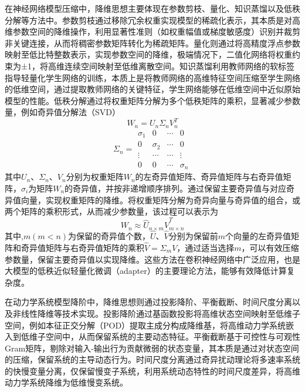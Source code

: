 在神经网络模型压缩中，降维思想主要体现在参数剪枝\cite{liu2023filter}、量化\cite{jacob2018quantization}、知识蒸馏\cite{hinton2015distilling}以及低秩分解\cite{han2015deep}等方法中。参数剪枝通过移除冗余权重实现模型的稀疏化表示，其本质是对高维参数空间的降维操作，利用显著性准则（如权重幅值或梯度敏感度）识别并裁剪非关键连接，从而将稠密参数矩阵转化为稀疏矩阵。量化则通过将高精度浮点参数映射至低比特整数表示，实现参数空间的降维，极端情况下，二值化网络将权重约束为±1，将高维连续空间映射至低维离散空间。知识蒸馏利用教师网络的软标签指导轻量化学生网络的训练，本质上是将教师网络的高维特征空间压缩至学生网络的低维空间，通过提取教师网络的关键特征，学生网络能够在低维空间中近似原始模型的性能。低秩分解通过将权重矩阵分解为多个低秩矩阵的乘积，显著减少参数量，例如奇异值分解法（SVD）
\begin{equation}
  \label{eq:svd}
  W_n = U_n\Sigma_n {V_n^T}
\end{equation}
\begin{equation}
  \label{eq:Sigma}
{\Sigma_n} = \begin{array}{*{20}{c}}
  {{\sigma _1}}&0& \cdots &0\\
  0&{{\sigma _2}}& \cdots &0\\
   \vdots & \cdots & \cdots & \vdots \\
  0&0& \cdots &{{\sigma _n}}
  \end{array}
\end{equation}
其中$U_n$、$\Sigma_n$、$V_n$分别为权重矩阵$W_n$的左奇异值矩阵、奇异值矩阵与右奇异值矩阵，$\sigma_i$为矩阵$W_n$的奇异值，并按非递增顺序排列。通过保留主要奇异值与对应奇异值向量，实现权重矩阵的降维。将权重矩阵分解为奇异向量与奇异值的组合，或两个矩阵的乘积形式，从而减少参数量，该过程可以表示为
\begin{equation}
  \label{eq:lowrank}
  W_n \approx {\hat{U}_{n\times m}}{\hat{V}_{m\times n}^T}
\end{equation}
其中,$m(m<n)$为保留的奇异值个数，$\hat{U}$、$\hat{V}$分别为保留前$m$个向量的左奇异值矩阵和奇异值矩阵与右奇异值矩阵的乘积$\hat{V}=\Sigma_mV$，通过适当选择$m$，可以有效压缩参数量，保留主要奇异值以实现降维。这些方法在卷积神经网络中广泛应用，也是大模型的低秩近似轻量化微调（adapter）\cite{houlsby2019parameter}的主要理论方法，能够有效降低计算复杂度。

在动力学系统模型降阶中，降维思想则通过投影降阶、平衡截断、时间尺度分离以及非线性降维等技术实现。投影降阶通过基函数投影将高维状态空间映射至低维子空间，例如本征正交分解（POD）提取主成分构成降维基，将高维动力学系统嵌入到低维子空间中，从而保留系统的主要动态特征。平衡截断基于可控性与可观性Gram矩阵，剔除对输入-输出行为贡献微弱的状态变量，其本质是通过对状态空间的压缩，保留系统的主导动态行为。时间尺度分离通过奇异扰动理论将多速率系统的快慢变量分离，仅保留慢变子系统，利用系统动态特性的时间尺度差异，将高维动力学系统降维为低维慢变系统。

